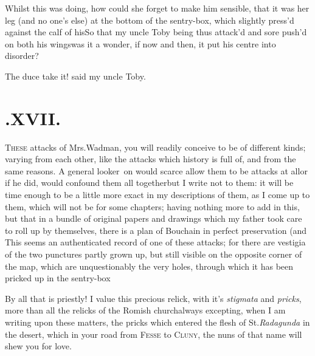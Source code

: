 \documentclass{article}
\begin{document}
Whilst this was doing, how could she forget to make him
sensible, that it was her leg (and no one’s else) at the
bottom of the sentry-box, which slightly press’d against the
calf of his\tsh So that my uncle Toby being thus
attack’d and sore push’d on both his
wings\tsh was it a wonder, if now and then, it put his
centre into disorder?\tsh

\tsh The duce take it! said my uncle Toby.

\newpage
\section{.\enspace XVII.}

\lettrine{T}{hese} attacks of Mrs.\@ Wadman,
you will readily conceive to be of different kinds; varying from
each other, like the attacks which history is full of, and from the
same reasons. A general looker~on would scarce allow them to be
attacks at all\tsh or if he did, would confound them all
together\tsh but I write not to them: it will be time
enough to be a little more exact in my descriptions of them, as I
come up to them, which will not be for some chapters; having
nothing more to add in this, but that in a bundle of original
papers and drawings which my father took care to roll up by
themselves, there is a plan of\pb 
Bouchain in perfect preservation (and
This seems an
authenticated record of one of these attacks; for there are
vestigia of the two punctures partly grown up, but still visible on
the opposite corner of the map, which are unquestionably the very
holes, through which it has been pricked up in the
sentry-box\tsh

By all that is priestly! I value this precious relick, with it’s
\textit{stigmata} and\pb
\textit{pricks}, more than all the relicks of the
Romish church\tsh always excepting, when I am
writing upon these matters, the pricks which entered the flesh of
St.\@ \textit{Radagunda} in the desert, which in your road from
\textsc{Fesse} to \textsc{Cluny}, the nuns of that name
will shew you for love.

\medskip
\end{document}
